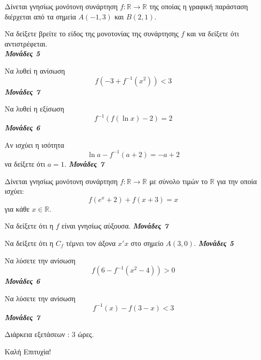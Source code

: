 \documentclass[11pt,a4paper]{article}
\newcommand{\monades}[1]{
\hspace*{\fill}
\textbf{\textit{{Μονάδες #1}}}}
\newcommand{\kaliepityxia}{\vfill
\begin{flushright}
Καλή Επιτυχία!
\end{flushright}}
\newcommand{\diarkeia}[1]{\begin{flushright}
Διάρκεια εξετάσεων : #1 ώρες.
\end{flushright}}
\begin{document}
\begin{thema}
\begin{erwthma}
\end{erwthma}
\item Δίνεται γνησίως μονότονη συνάρτηση $ f:\mathbb{R}\to\mathbb{R} $ της οποίας η γραφική παράσταση διέρχεται από τα σημεία $ A(-1,3) $ και $ B(2,1) $.
\begin{erwthma}
\item Να δείξετε βρείτε το είδος της μονοτονίας της συνάρτησης $ f $ και να δείξετε ότι αντιστρέφεται.\\\monades{5}
\item Να λυθεί η ανίσωση
\[ f\left(-3+f^{-1}(x^2)\right)<3 \]\monades{7}
\item Να λυθεί η εξίσωση
\[ f^{-1}\left(f(\ln{x})-2\right)=2 \]\monades{6}
\item Αν ισχύει η ισότητα
\[ \ln{a}-f^{-1}(a+2)=-a+2 \]
να δείξετε ότι $ a=1 $.\monades{7}
\end{erwthma}
\item Δίνεται γνησίως μονότονη συνάρτηση $ f:\mathbb{R}\to\mathbb{R} $ με σύνολο τιμών το $ \mathbb{R} $ για την οποία ισχύει:
\[ f\left(e^x+2\right)+f(x+3)=x \]
για κάθε $ x\in\mathbb{R} $.
\begin{erwthma}
\item Να δείξετε ότι η $ f $ είναι γνησίως αύξουσα.\monades{7}
\item Να δείξετε ότι η $ C_f $ τέμνει τον άξονα $ x'x $ στο σημείο $ A(3,0) $.\monades{5}
\item Να λύσετε την ανίσωση \[ f\left(6-f^{-1}\left(x^2-4\right)\right)>0 \]\monades{6}
\item Να λύσετε την ανίσωση
\[ f^{-1}(x)-f(3-x)<3 \]\monades{7}
\end{erwthma}
\end{thema}
\diarkeia{3}
\kaliepityxia
\end{document}
